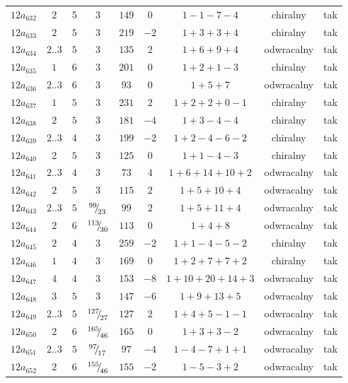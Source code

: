 \begin{longtable}{ccccccccc}
$12a_{632}$ & $2$ & $5$ & $3$ & $149$ & $0$ & $1-1-7-4$ & chiralny & tak \\
$12a_{633}$ & $2$ & $5$ & $3$ & $219$ & $-2$ & $1+3+3+4$ & chiralny & tak \\
$12a_{634}$ & $2..3$ & $5$ & $3$ & $135$ & $2$ & $1+6+9+4$ & odwracalny & tak \\
$12a_{635}$ & $1$ & $6$ & $3$ & $201$ & $0$ & $1+2+1-3$ & chiralny & tak \\
$12a_{636}$ & $2..3$ & $6$ & $3$ & $93$ & $0$ & $1+5+7$ & odwracalny & tak \\
$12a_{637}$ & $1$ & $5$ & $3$ & $231$ & $2$ & $1+2+2+0-1$ & chiralny & tak \\
$12a_{638}$ & $2$ & $5$ & $3$ & $181$ & $-4$ & $1+3-4-4$ & chiralny & tak \\
$12a_{639}$ & $2..3$ & $4$ & $3$ & $199$ & $-2$ & $1+2-4-6-2$ & chiralny & tak \\
$12a_{640}$ & $2$ & $5$ & $3$ & $125$ & $0$ & $1+1-4-3$ & chiralny & tak \\
$12a_{641}$ & $2..3$ & $4$ & $3$ & $73$ & $4$ & $1+6+14+10+2$ & odwracalny & tak \\
$12a_{642}$ & $2$ & $5$ & $3$ & $115$ & $2$ & $1+5+10+4$ & odwracalny & tak \\
$12a_{643}$ & $2..3$ & $5$ & ${}^{99}{\mskip -5mu/\mskip -3mu}_{23}$ & $99$ & $2$ & $1+5+11+4$ & odwracalny & tak \\
$12a_{644}$ & $2$ & $6$ & ${}^{113}{\mskip -5mu/\mskip -3mu}_{30}$ & $113$ & $0$ & $1+4+8$ & odwracalny & tak \\
$12a_{645}$ & $2$ & $4$ & $3$ & $259$ & $-2$ & $1+1-4-5-2$ & chiralny & tak \\
$12a_{646}$ & $1$ & $4$ & $3$ & $169$ & $0$ & $1+2+7+7+2$ & chiralny & tak \\
$12a_{647}$ & $4$ & $4$ & $3$ & $153$ & $-8$ & $1+10+20+14+3$ & odwracalny & tak \\
$12a_{648}$ & $3$ & $5$ & $3$ & $147$ & $-6$ & $1+9+13+5$ & odwracalny & tak \\
$12a_{649}$ & $2..3$ & $5$ & ${}^{127}{\mskip -5mu/\mskip -3mu}_{27}$ & $127$ & $2$ & $1+4+5-1-1$ & odwracalny & tak \\
$12a_{650}$ & $2$ & $6$ & ${}^{165}{\mskip -5mu/\mskip -3mu}_{46}$ & $165$ & $0$ & $1+3+3-2$ & odwracalny & tak \\
$12a_{651}$ & $2..3$ & $5$ & ${}^{97}{\mskip -5mu/\mskip -3mu}_{17}$ & $97$ & $-4$ & $1-4-7+1+1$ & odwracalny & tak \\
$12a_{652}$ & $2$ & $6$ & ${}^{155}{\mskip -5mu/\mskip -3mu}_{46}$ & $155$ & $-2$ & $1-5-3+2$ & odwracalny & tak \\

\end{longtable}
